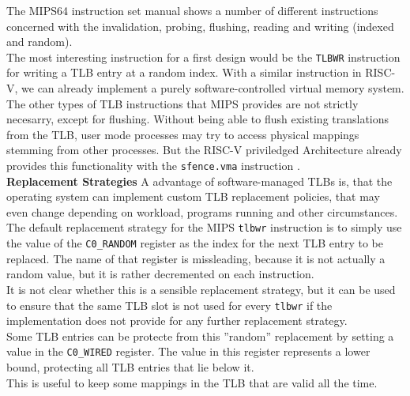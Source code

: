 
The MIPS64 instruction set manual \cite{MIPSArchitectureProgrammers2016}
shows a number of different instructions concerned with the invalidation, probing, flushing, reading
and writing (indexed and random).\\
The most interesting instruction for a first design would be the \texttt{TLBWR} instruction for writing a TLB
entry at a random index. With a similar instruction in RISC-V, we can already implement a purely
software-controlled virtual memory system.\\
The other types of TLB instructions that MIPS provides are not strictly necesarry,
except for flushing. Without being able to flush existing translations from the TLB,
user mode processes may try to access physical mappings stemming from other processes.
But the RISC-V priviledged Architecture already provides this functionality
with the \texttt{sfence.vma} instruction \cite{riscvreader}.\\


\textbf{Replacement Strategies} A advantage of software-managed TLBs is, that the operating system can implement custom
TLB replacement policies, that may even change depending on workload, programs running
and other circumstances.\\
The default replacement strategy for the MIPS \texttt{tlbwr} instruction is to simply
use the value of the \texttt{C0\_RANDOM} register as the index for the next TLB entry
to be replaced. The name of that register is missleading, because it is not actually a
random value, but it is rather decremented on each instruction\cite{heiserAnatomyHighPerformanceMicrokernel}.\\
It is not clear whether this is a sensible replacement strategy,
but it can be used to ensure that the same TLB slot is not used for every \texttt{tlbwr} if the implementation
does not provide for any further replacement strategy.\\
Some TLB entries can be protecte from this ''random'' replacement by setting a value in the \texttt{C0\_WIRED}
register. The value in this register represents a lower bound, protecting all TLB entries that lie below it.\\
This is useful to keep some mappings in the TLB that are valid all the time.

